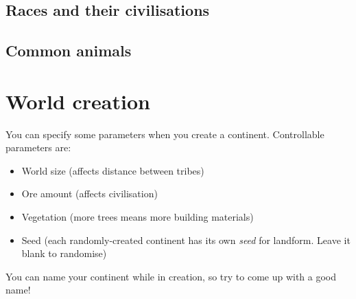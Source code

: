 \documentclass[stock,9pt,nohan]{oblivoir}
\begin{document}
	
	\subsection{Races and their civilisations}
	
	
	\subsection{Common animals}
	
	
\section{World creation}
	You can specify some parameters when you create a continent. Controllable parameters are:
	\begin{itemize}
	\item World size (affects distance between tribes)
	\item Ore amount (affects civilisation)
	\item Vegetation (more trees means more building materials)
	\item Seed (each randomly-created continent has its own \emph{seed} for landform. Leave it blank to randomise)
	\end{itemize}
	
	You can name your continent while in creation, so try to come up with a good name!
	
\end{document}
